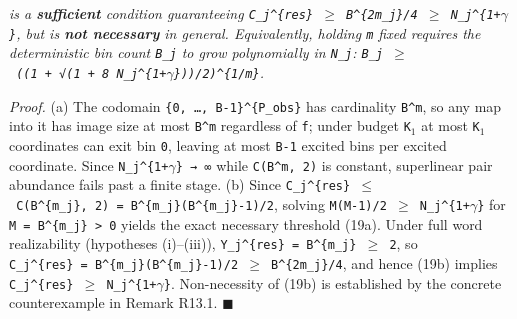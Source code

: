 \documentclass[
  american,
  11pt,
  letterpaper,
]{article}
\begin{document}
\emph{is a \textbf{sufficient} condition guaranteeing \texttt{C\_j\^{}\{res\}\ \ensuremath{\geq}\ B\^{}\{2m\_j\}/4\ \ensuremath{\geq}\ N\_j\^{}\{1+\ensuremath{\gamma}\}}, but is \textbf{not necessary} in general. Equivalently, holding \texttt{m} fixed requires the deterministic bin count \texttt{B\_j} to grow polynomially in \texttt{N\_j}: \texttt{B\_j\ \ensuremath{\geq}\ ((1\ +\ √(1\ +\ 8\ N\_j\^{}\{1+\ensuremath{\gamma}\}))/2)\^{}\{1/m\}}.}

\emph{Proof.} (a) The codomain \texttt{\{0,\ …,\ B-1\}\^{}\{P\_obs\}} has cardinality \texttt{B\^{}m}, so any map into it has image size at most \texttt{B\^{}m} regardless of \texttt{f}; under budget \texttt{K\ensuremath{{}_{1}}} at most \texttt{K\ensuremath{{}_{1}}} coordinates can exit bin \texttt{0}, leaving at most \texttt{B-1} excited bins per excited coordinate. Since \texttt{N\_j\^{}\{1+\ensuremath{\gamma}\}\ →\ ∞} while \texttt{C(B\^{}m,\ 2)} is constant, superlinear pair abundance fails past a finite stage. (b) Since \texttt{C\_j\^{}\{res\}\ \ensuremath{\leq}\ C(B\^{}\{m\_j\},\ 2)\ =\ B\^{}\{m\_j\}(B\^{}\{m\_j\}-1)/2}, solving \texttt{M(M-1)/2\ \ensuremath{\geq}\ N\_j\^{}\{1+\ensuremath{\gamma}\}} for \texttt{M\ =\ B\^{}\{m\_j\}\ \textgreater{}\ 0} yields the exact necessary threshold (19a). Under full word realizability (hypotheses (i)--(iii)), \texttt{\textbar{}Y\_j\^{}\{res\}\textbar{}\ =\ B\^{}\{m\_j\}\ \ensuremath{\geq}\ 2}, so \texttt{C\_j\^{}\{res\}\ =\ B\^{}\{m\_j\}(B\^{}\{m\_j\}-1)/2\ \ensuremath{\geq}\ B\^{}\{2m\_j\}/4}, and hence (19b) implies \texttt{C\_j\^{}\{res\}\ \ensuremath{\geq}\ N\_j\^{}\{1+\ensuremath{\gamma}\}}. Non-necessity of (19b) is established by the concrete counterexample in Remark R13.1. \ensuremath{\blacksquare}
\end{document}

